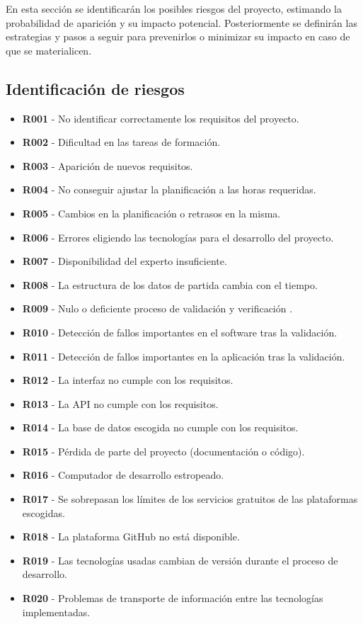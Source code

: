En esta sección se identificarán los posibles riesgos del proyecto, estimando la probabilidad de aparición y su impacto potencial. Posteriormente se definirán las estrategias y pasos a seguir para prevenirlos o minimizar su impacto en caso de que se materialicen.

\subsection{Identificación de riesgos}
\begin{itemize}
\item \textbf{R001} - No identificar correctamente los requisitos del proyecto.
\item \textbf{R002} - Dificultad en las tareas de formación.
\item \textbf{R003} - Aparición de nuevos requisitos.
\item \textbf{R004} - No conseguir ajustar la planificación a las horas requeridas.
\item \textbf{R005} - Cambios en la planificación o retrasos en la misma.
\item \textbf{R006} - Errores eligiendo las tecnologías para el desarrollo del proyecto.
\item \textbf{R007} - Disponibilidad del experto insuficiente.
\item \textbf{R008} - La estructura de los datos de partida cambia con el tiempo.
\item \textbf{R009} - Nulo o deficiente proceso de validación y verificación .
\item \textbf{R010} - Detección de fallos importantes en el software tras la validación.
\item \textbf{R011} - Detección de fallos importantes en la aplicación tras la validación.
\item \textbf{R012} - La interfaz no cumple con los requisitos.
\item \textbf{R013} - La API no cumple con los requisitos.
\item \textbf{R014} - La base de datos escogida no cumple con los requisitos.
\item \textbf{R015} - Pérdida de parte del proyecto (documentación o código).
\item \textbf{R016} - Computador de desarrollo estropeado.
\item \textbf{R017} - Se sobrepasan los límites de los servicios gratuitos de las plataformas escogidas.
\item \textbf{R018} - La plataforma GitHub no está disponible.
\item \textbf{R019} - Las tecnologías usadas cambian de versión durante el proceso de desarrollo.
\item \textbf{R020} - Problemas de transporte de información entre las tecnologías implementadas.
\end{itemize}

